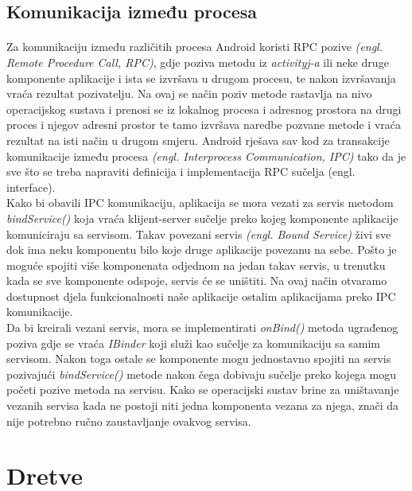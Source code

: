 \documentclass[times, utf8, zavrsni]{fer}
\begin{document}
\subsection{Komunikacija između procesa}
\paragraph{}
Za komunikaciju između različitih procesa Android koristi RPC pozive \textit{(engl. Remote Procedure Call, RPC)}, gdje poziva metodu iz \textit{activityj-a} ili neke druge komponente aplikacije i ista se izvršava u drugom procesu, te nakon izvršavanja vraća rezultat pozivatelju. Na ovaj se način poziv metode rastavlja na nivo operacijskog sustava i prenosi se iz lokalnog procesa i adresnog prostora na drugi proces i njegov adresni prostor te tamo izvršava naredbe pozvane metode i vraća rezultat na isti način u drugom smjeru. Android rješava sav kod za transakcije komunikacije između procesa \textit{(engl. Interprocess Communication, IPC)} tako da je sve što se treba napraviti definicija i implementacija RPC sučelja (engl. interface).\\

Kako bi obavili IPC komunikaciju, aplikacija se mora vezati za servis metodom \textit{bindService()} koja vraća klijent-server sučelje preko kojeg komponente aplikacije komuniciraju sa servisom. Takav povezani servis \textit{(engl. Bound Service)} živi sve dok ima neku komponentu bilo koje druge aplikacije povezanu na sebe. Pošto je moguće spojiti više komponenata odjednom na jedan takav servis, u trenutku kada se sve komponente odspoje, servis će se uništiti. Na ovaj način otvaramo dostupnost djela funkcionalnosti naše aplikacije ostalim aplikacijama preko IPC komunikacije.\\

Da bi kreirali vezani servis, mora se implementirati \textit{onBind()} metoda ugrađenog poziva gdje se vraća \textit{IBinder} koji služi kao sučelje za komunikaciju sa samim servisom. Nakon toga ostale se komponente mogu jednostavno spojiti na servis pozivajući \textit{bindService()} metode nakon čega dobivaju sučelje preko kojega mogu početi pozive metoda na servisu. Kako se operacijski sustav brine za uništavanje vezanih servisa kada ne postoji niti jedna komponenta vezana za njega, znači da nije potrebno ručno zaustavljanje ovakvog servisa.
 
\section{Dretve}
\end{document}
